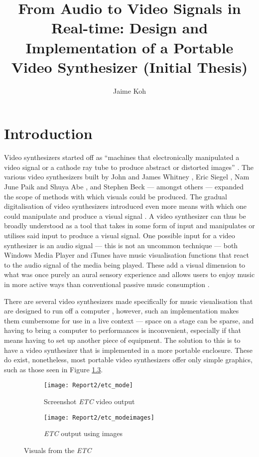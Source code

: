 \documentclass{report}
\title{From Audio to Video Signals in Real-time: Design and Implementation of a Portable Video Synthesizer (Initial Thesis)}
\author{Jaime Koh}
\begin{document}
\newpage
\maketitle
\tableofcontents
\newpage

\chapter{Introduction}
Video synthesizers started off as ``machines that electronically manipulated a video signal or a cathode ray tube to produce abstract or distorted images'' \cite{Collopy2014}. The various video synthesizers built by John and James Whitney \cite{Patterson2009}, Eric Siegel \cite{ElectronicArtsIntermix}, Nam June Paik and Shuya Abe \cite{Furlong1983}, and Stephen Beck \cite{Beck1992} --- amongst others --- expanded the scope of methods with which visuals could be produced. The gradual digitalisation of video synthesizers introduced even more means with which one could manipulate and produce a visual signal \cite{Collopy2014}. A video synthesizer can thus be broadly understood as a tool that takes in some form of input and manipulates or utilises said input to produce a visual signal. One possible input for a video synthesizer is an audio signal --- this is not an uncommon technique --- both Windows Media Player and iTunes have music visualisation functions that react to the audio signal of the media being played. These add a visual dimension to what was once purely an aural sensory experience and allows users to enjoy music in more active ways than conventional passive music consumption \cite{Casey2008}. \par

There are several video synthesizers made specifically for music visualisation that are designed to run off a computer \cite{Casey2008}, however, such an implementation makes them cumbersome for use in a live context --- space on a stage can be sparse, and having to bring a computer to performances is inconvenient, especially if that means having to set up another piece of equipment. The solution to this is to have a video synthesizer that is implemented in a more portable enclosure. These do exist, nonetheless, most portable video synthesizers offer only simple graphics, such as those seen in Figure \ref{fig:etc}.

\begin{figure}[b]
  \begin{subfigure}{0.5\textwidth}
    \centering
    \texttt{[image: Report2/etc\_mode]}
    \caption{Screenshot \textit{ETC} video output}
    \label{fig:etc_mode}
  \end{subfigure}
  \begin{subfigure}{0.5\textwidth}
    \centering
    \texttt{[image: Report2/etc\_modeimages]}
    \caption{\textit{ETC} output using images}
    \label{fig:etc_modeimages}
  \end{subfigure}
  \caption{Visuals from the \textit{ETC}}
  \label{fig:etc}
\end{figure}
\end{document}
